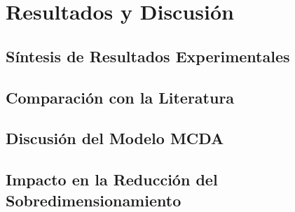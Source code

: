 \section{Resultados y Discusión}


\subsection{Síntesis de Resultados Experimentales}


\subsection{Comparación con la Literatura}


\subsection{Discusión del Modelo MCDA}


\subsection{Impacto en la Reducción del Sobredimensionamiento}


